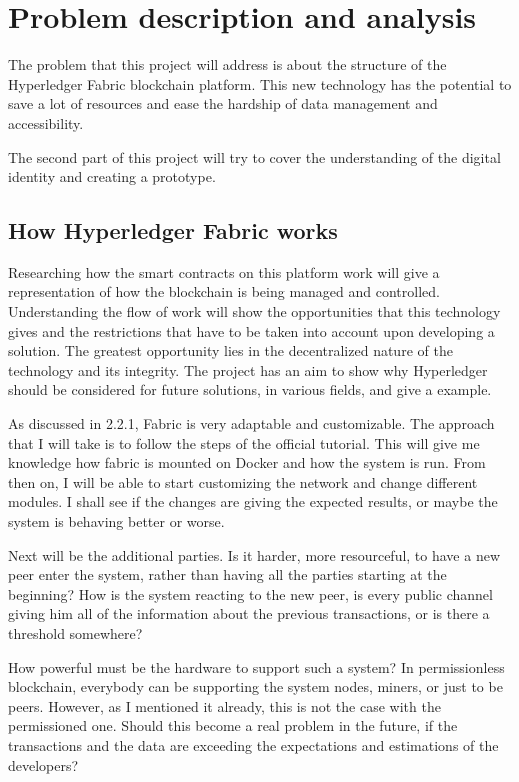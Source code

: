 \documentclass[a4paper,11pt]{report}
\begin{document}

\chapter{Problem description and analysis}

\label{approach}
The problem that this project will address is about the structure of the Hyperledger Fabric blockchain platform. This new technology has the potential to save a lot of resources and ease the hardship of data management and accessibility.  

 	The second part of this project will try to cover the understanding of the digital identity and creating a prototype. 
\section{How Hyperledger Fabric works}
\label{fabricWorks}
Researching how the smart contracts on this platform work will give a representation of how the blockchain is being managed and controlled. Understanding the flow of work will show the opportunities that this technology gives and the restrictions that have to be taken into account upon developing a solution. The greatest opportunity lies in the decentralized nature of the technology and its integrity. The project has an aim to show why Hyperledger should be considered for future solutions, in various fields, and give a example.

As discussed in 2.2.1, Fabric is very adaptable and customizable. The approach that I will take is to follow the steps of the official tutorial. This will give me knowledge how fabric is mounted on Docker and how the system is run. From then on, I will be able to start customizing the network and change different modules. I shall see if the changes are giving the expected results, or maybe the system is behaving better or worse.
 
Next will be the additional parties. Is it harder, more resourceful, to have a new peer enter the system, rather than having all the parties starting at the beginning? How is the system reacting to the new peer, is every public channel giving him all of the information about the previous transactions, or is there a threshold somewhere? 

How powerful must be the hardware to support such a system? In permissionless blockchain, everybody can be supporting the system nodes, miners, or just to be peers. However, as I mentioned it already, this is not the case with the permissioned one. Should this become a real problem in the future, if the transactions and the data are exceeding the expectations and estimations of the developers? 
\end{document}
